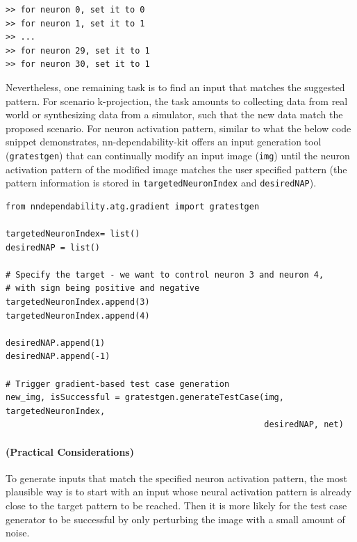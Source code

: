\documentclass{article}
\begin{document}
\begin{small}
\color{red}
\begin{verbatim}
>> for neuron 0, set it to 0
>> for neuron 1, set it to 1
>> ...
>> for neuron 29, set it to 1
>> for neuron 30, set it to 1
\end{verbatim}
\end{small}

Nevertheless, one remaining task is to find an input that matches the suggested pattern. For scenario k-projection, the task amounts to collecting data from real world or synthesizing data from a simulator, such that the new data  match the proposed scenario. For neuron activation pattern, similar to what the below code snippet demonstrates,  \textsf{nn-dependability-kit} offers an input generation tool (\texttt{gratestgen}) that can continually modify an input image (\texttt{img}) until the neuron activation pattern of the modified image matches the user specified pattern (the pattern information is stored in \texttt{targetedNeuronIndex} and \texttt{desiredNAP}).  

\begin{small}
\color{blue}
\begin{verbatim}
from nndependability.atg.gradient import gratestgen

targetedNeuronIndex= list()
desiredNAP = list()

# Specify the target - we want to control neuron 3 and neuron 4, 
# with sign being positive and negative
targetedNeuronIndex.append(3)
targetedNeuronIndex.append(4)

desiredNAP.append(1)
desiredNAP.append(-1)

# Trigger gradient-based test case generation
new_img, isSuccessful = gratestgen.generateTestCase(img, targetedNeuronIndex, 
                                                    desiredNAP, net)
\end{verbatim}
\end{small}


\paragraph{(Practical Considerations)} To generate  inputs that match the specified neuron activation pattern, the most plausible way is to start with an input whose neural activation pattern is already close to the target pattern to be reached. Then it is more likely for the test case generator to be successful by only perturbing the image with a small amount of noise. 
\end{document}
